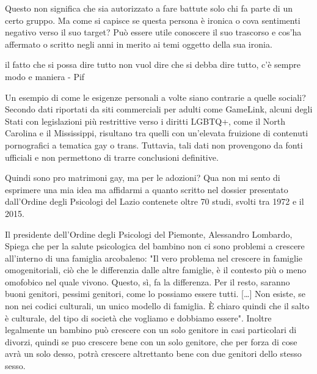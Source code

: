 \documentclass[12pt]{book} %
\begin{document}
\begin{mdframed}[linewidth=1pt]
Questo non significa che sia autorizzato a fare battute solo chi fa parte di un certo gruppo. Ma come si capisce se questa persona è ironica o cova sentimenti negativo verso il suo target? Può essere utile conoscere il
suo trascorso e cos'ha affermato o scritto negli anni in merito ai temi oggetto della sua ironia.

il fatto che si possa dire tutto non vuol dire che si debba dire tutto, c'è sempre modo e maniera -
Pif
\end{mdframed}

\begin{mdframed}[linewidth=1pt]
Un esempio di come le esigenze personali a volte siano contrarie a quelle sociali? Secondo dati riportati da siti commerciali per adulti come GameLink, alcuni degli Stati con legislazioni più restrittive verso i diritti LGBTQ+, come il North Carolina e il Mississippi, risultano tra quelli con un’elevata fruizione di contenuti pornografici a tematica gay o trans. Tuttavia, tali dati non provengono da fonti ufficiali e non permettono di trarre conclusioni definitive.

Quindi sono pro matrimoni gay, ma per le adozioni? Qua non mi sento di esprimere una mia idea ma affidarmi a quanto scritto nel dossier presentato dall'Ordine degli Psicologi del Lazio contenete oltre 70 studi, svolti tra 1972 e il 2015. 

Il presidente dell'Ordine degli Psicologi del Piemonte, Alessandro Lombardo, Spiega che per la salute psicologica del
bambino non ci sono problemi a crescere all'interno di una famiglia arcobaleno: "Il
vero problema nel crescere in famiglie omogenitoriali, ciò che le differenzia dalle altre famiglie, è il contesto più o
meno omofobico nel quale vivono. Questo, sì, fa la differenza. Per il resto, saranno buoni genitori, pessimi genitori,
come lo possiamo essere tutti. […] Non esiste, se non nei codici culturali, un unico modello di famiglia. È chiaro
quindi che il salto è culturale, del tipo di società che vogliamo e dobbiamo
essere". Inoltre legalmente un bambino può crescere con un solo genitore in casi particolari di divorzi, quindi se puo crescere bene con un solo genitore, che per forza di cose avrà un solo desso, potrà crescere altrettanto bene con due genitori dello stesso sesso.
\end{mdframed}
\end{document}
